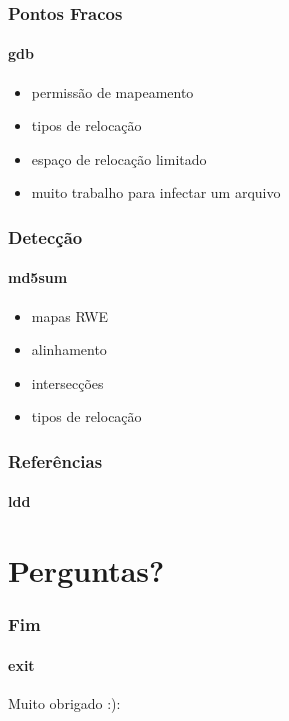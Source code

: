 \documentclass[portuguese]{beamer}
\begin{document}
\begin{frame}
	\frametitle{Pontos Fracos}
	\framesubtitle{gdb}
	\begin{itemize}
		\item permissão de mapeamento
		\item tipos de relocação
		\item espaço de relocação limitado
		\item muito trabalho para infectar um arquivo
	\end{itemize}
\end{frame}

\begin{frame}
	\frametitle{Detecção\cite{elf-rela-obfuscation}\cite{relobfuscate}}
	\framesubtitle{md5sum}
	\begin{itemize}
		\item mapas RWE
		\item alinhamento
		\item intersecções
		\item tipos de relocação
	\end{itemize}
\end{frame}

\begin{frame}[allowframebreaks]
	\frametitle{Referências}
	\framesubtitle{ldd}
	\printbibliography[heading=none]
\end{frame}

\section{Perguntas?}

\begin{frame}
	\frametitle{Fim}
	\framesubtitle{exit}
	Muito obrigado :):
\end{frame}
\end{document}
